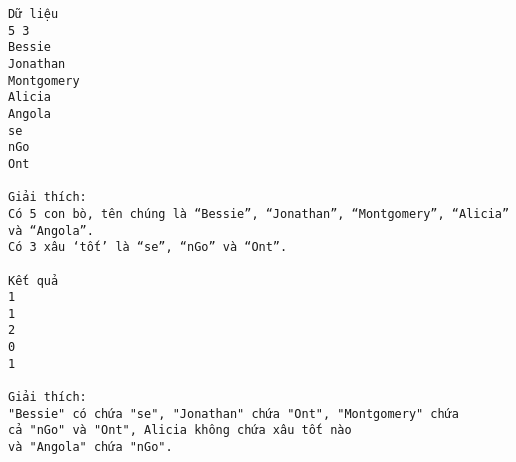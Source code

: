\begin{verbatim}
Dữ liệu
5 3
Bessie
Jonathan
Montgomery
Alicia
Angola
se
nGo
Ont

Giải thích:
Có 5 con bò, tên chúng là “Bessie”, “Jonathan”, “Montgomery”, “Alicia” và “Angola”.
Có 3 xâu ‘tốt’ là “se”, “nGo” và “Ont”.

Kết quả
1
1
2
0
1

Giải thích:
"Bessie" có chứa "se", "Jonathan" chứa "Ont", "Montgomery" chứa 
cả "nGo" và "Ont", Alicia không chứa xâu tốt nào 
và "Angola" chứa "nGo".
\end{verbatim}
